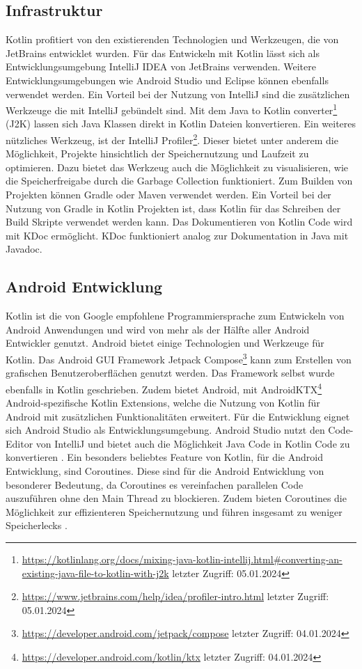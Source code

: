 \documentclass{article}
\begin{document}
\subsection{Infrastruktur}
Kotlin profitiert von den existierenden Technologien und Werkzeugen, die von JetBrains entwicklet wurden. Für das Entwickeln mit Kotlin lässt sich als Entwicklungsumgebung IntelliJ IDEA von JetBrains verwenden. Weitere Entwicklungsumgebungen wie Android Studio und Eclipse können ebenfalls verwendet werden. Ein Vorteil bei der Nutzung von IntelliJ sind die zusätzlichen Werkzeuge die mit IntelliJ gebündelt sind. Mit dem Java to Kotlin converter\footnote{\url{https://kotlinlang.org/docs/mixing-java-kotlin-intellij.html#converting-an-existing-java-file-to-kotlin-with-j2k} letzter Zugriff: 05.01.2024} (J2K) lassen sich Java Klassen direkt in Kotlin Dateien konvertieren. Ein weiteres nützliches Werkzeug, ist der IntelliJ Profiler\footnote{\url{https://www.jetbrains.com/help/idea/profiler-intro.html} letzter Zugriff: 05.01.2024}. Dieser bietet unter anderem die Möglichkeit, Projekte hinsichtlich der Speichernutzung und Laufzeit zu optimieren. Dazu bietet das Werkzeug auch die Möglichkeit zu visualisieren, wie die Speicherfreigabe durch die Garbage Collection funktioniert. \newline
Zum Builden von Projekten können Gradle oder Maven verwendet werden. Ein Vorteil bei der Nutzung von Gradle in Kotlin Projekten ist, dass Kotlin für das Schreiben der Build Skripte verwendet werden kann. Das Dokumentieren von Kotlin Code wird mit KDoc ermöglicht. KDoc funktioniert analog zur Dokumentation in Java mit Javadoc.

\subsection{Android Entwicklung}
Kotlin ist die von Google empfohlene Programmiersprache zum Entwickeln von Android Anwendungen und wird von mehr als der Hälfte aller Android Entwickler genutzt. Android bietet einige Technologien und Werkzeuge für Kotlin. Das Android GUI Framework Jetpack Compose\footnote{\url{https://developer.android.com/jetpack/compose} letzter Zugriff: 04.01.2024} kann zum Erstellen von grafischen Benutzeroberflächen genutzt werden. Das Framework selbst wurde ebenfalls in Kotlin geschrieben. Zudem bietet Android, mit AndroidKTX\footnote{\url{https://developer.android.com/kotlin/ktx} letzter Zugriff: 04.01.2024} Android-spezifische Kotlin Extensions, welche die Nutzung von Kotlin für Android mit zusätzlichen Funktionalitäten erweitert. Für die Entwicklung eignet sich Android Studio als Entwicklungsumgebung. Android Studio nutzt den Code-Editor von IntelliJ und bietet auch die Möglichkeit Java Code in Kotlin Code zu konvertieren \cite{AndroidKotlin}. \newline
Ein besonders beliebtes Feature von Kotlin, für die Android Entwicklung, sind Coroutines. Diese sind für die Android Entwicklung von besonderer Bedeutung, da Coroutines es vereinfachen parallelen Code auszuführen ohne den Main Thread zu blockieren. Zudem bieten Coroutines die Möglichkeit zur effizienteren Speichernutzung und führen insgesamt zu weniger Speicherlecks \cite{AndroidCoroutine}.
\end{document}
